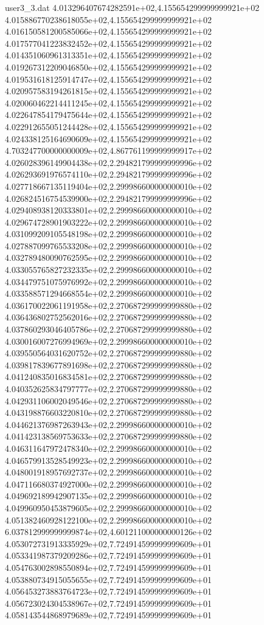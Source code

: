 \begin{filecontents}{user3_3.dat}
4.013296407674282591e+02,4.155654299999999921e+02
4.015886770238618055e+02,4.155654299999999921e+02
4.016150581200585066e+02,4.155654299999999921e+02
4.017577041223832452e+02,4.155654299999999921e+02
4.014351060961313351e+02,4.155654299999999921e+02
4.019267312209046850e+02,4.155654299999999921e+02
4.019531618125914747e+02,4.155654299999999921e+02
4.020957583194261815e+02,4.155654299999999921e+02
4.020060462214411245e+02,4.155654299999999921e+02
4.022647854179475644e+02,4.155654299999999921e+02
4.022912655051244428e+02,4.155654299999999921e+02
4.024338125164690609e+02,4.155654299999999921e+02
4.703247700000000009e+02,4.867761199999999917e+02
4.026028396149904438e+02,2.294821799999999996e+02
4.026293691976574110e+02,2.294821799999999996e+02
4.027718667135119404e+02,2.299986600000000010e+02
4.026824516754539900e+02,2.294821799999999996e+02
4.029408938120333801e+02,2.299986600000000010e+02
4.029674728901903222e+02,2.299986600000000010e+02
4.031099209105548198e+02,2.299986600000000010e+02
4.027887099765533208e+02,2.299986600000000010e+02
4.032789480090762595e+02,2.299986600000000010e+02
4.033055765827232335e+02,2.299986600000000010e+02
4.034479751075976992e+02,2.299986600000000010e+02
4.033588571294668554e+02,2.299986600000000010e+02
4.036170022061191958e+02,2.270687299999999880e+02
4.036436802752562016e+02,2.270687299999999880e+02
4.037860293046405786e+02,2.270687299999999880e+02
4.030016007276994969e+02,2.299986600000000010e+02
4.039550564031620752e+02,2.270687299999999880e+02
4.039817839677891698e+02,2.270687299999999880e+02
4.041240835016834581e+02,2.270687299999999880e+02
4.040352625834797777e+02,2.270687299999999880e+02
4.042931106002049546e+02,2.270687299999999880e+02
4.043198876603220810e+02,2.270687299999999880e+02
4.044621376987263943e+02,2.299986600000000010e+02
4.041423138569753633e+02,2.270687299999999880e+02
4.046311647972478340e+02,2.299986600000000010e+02
4.046579913528549923e+02,2.299986600000000010e+02
4.048001918957692737e+02,2.299986600000000010e+02
4.047116680374927000e+02,2.299986600000000010e+02
4.049692189942907135e+02,2.299986600000000010e+02
4.049960950453879605e+02,2.299986600000000010e+02
4.051382460928122100e+02,2.299986600000000010e+02
6.037812999999999874e+02,4.601211000000000126e+02
4.053072731913335929e+02,7.724914599999999609e+01
4.053341987379209286e+02,7.724914599999999609e+01
4.054763002898550894e+02,7.724914599999999609e+01
4.053880734915055655e+02,7.724914599999999609e+01
4.056453273883764723e+02,7.724914599999999609e+01
4.056723024304538967e+02,7.724914599999999609e+01
4.058143544868979689e+02,7.724914599999999609e+01

\end{filecontents}
